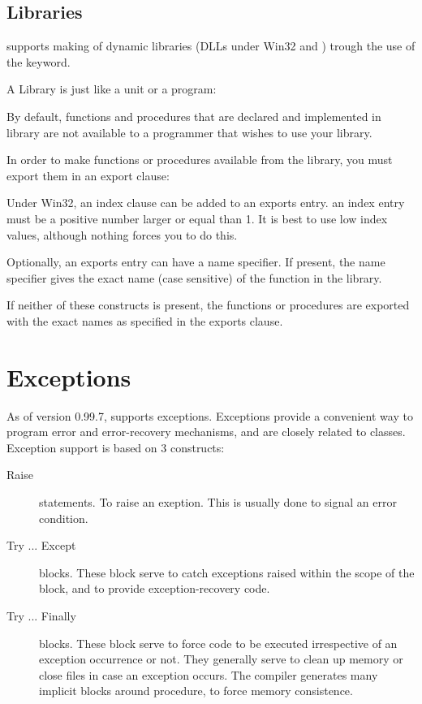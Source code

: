 \documentclass{report}
\begin{document}
\section{Libraries}
\fpc supports making of dynamic libraries (DLLs under Win32 and \ostwo) trough
the use of the  keyword.

A Library is just like a unit or a program:


By default, functions and procedures that are declared and implemented in
library are not available to a programmer that wishes to use your library.

In order to make functions or procedures available from the library,
you must export them in an export clause:



Under Win32, an index clause can be added to an exports entry.
an index entry must be a positive number larger or equal than 1.
It is best to use low index values, although nothing forces you to
do this.

Optionally, an exports entry can have a name specifier. If present, the name
specifier gives the exact name (case sensitive) of the function in the
library.

If neither of these constructs is present, the functions or procedures
are exported with the exact names as specified in the exports clause.




\chapter{Exceptions}
\label{ch:Exceptions}
As of version 0.99.7, \fpc supports exceptions. Exceptions provide a
convenient way to program error and error-recovery mechanisms, and are
closely related to classes.
Exception support is based on 3 constructs:
\begin{description}
\item [Raise\ ] statements. To raise an exeption. This is usually done to signal an
error condition.
\item [Try ... Except\ ] blocks. These block serve to catch exceptions
raised within the scope of the block, and to provide exception-recovery
code.
\item [Try ... Finally\ ] blocks. These block serve to force code to be
executed irrespective of an exception occurrence or not. They generally
serve to clean up memory or close files in case an exception occurs.
The compiler generates many implicit  blocks around
procedure, to force memory consistence.
\end{description}
\end{document}
